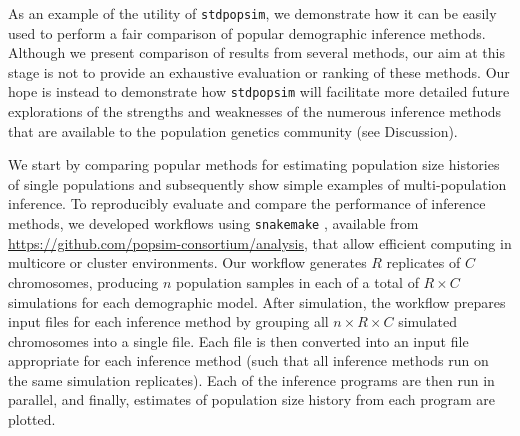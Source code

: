 \documentclass[12pt,halfline,a4paper]{ouparticle}
\newcommand{\stdpopsim}{\texttt{stdpopsim}\xspace}
\begin{document}
As an example of the utility of \stdpopsim, we demonstrate how it can be easily used
to perform a fair comparison of popular demographic inference methods.
Although we present comparison of results from several
methods, our aim at this stage is not to provide an exhaustive
evaluation or ranking of these methods. Our hope is instead to demonstrate how \stdpopsim
will facilitate more detailed future explorations of the strengths and weaknesses of the numerous
inference methods that are available to the population genetics community
(see Discussion).

We start by comparing popular methods for estimating
population size histories of single populations and subsequently
show simple examples of multi-population inference.
To reproducibly evaluate and compare the performance of inference methods, we developed
workflows using \texttt{snakemake} \citep{koster2012snakemake},
available from \url{https://github.com/popsim-consortium/analysis},
that allow efficient computing in multicore or cluster environments.
Our workflow generates $R$ replicates of $C$ chromosomes,
producing $n$ population samples in each of a total of $R \times C$ simulations for each demographic model.
After simulation,
the workflow prepares input files for each inference method
by grouping all $n \times R \times C$ simulated chromosomes
into a single file.
Each file is then converted into an input file appropriate for each inference method
(such that all inference methods run on the same simulation replicates).
Each of the inference programs are then run in parallel, and finally,
estimates of population size history from each program are plotted.
\end{document}
